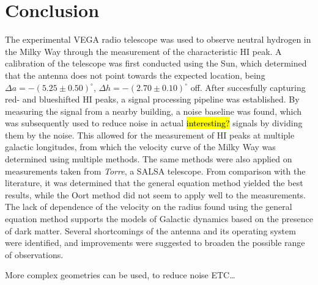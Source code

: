 \section{Conclusion}

The experimental VEGA radio telescope was used to observe neutral hydrogen in the Milky Way through the measurement of the characteristic HI peak. A calibration of the telescope was first conducted using the Sun, which determined that the antenna does not point towards the expected location, being $\Delta a = -(5.25 \pm 0.50)^\circ$, $\Delta h = -(2.70 \pm 0.10)^\circ$ off. After succesfully capturing red- and blueshifted HI peaks, a signal processing pipeline was established. By measuring the signal from a nearby building, a noise baseline was found, which was subsequently used to reduce noise in actual \hl{interesting?} signals by dividing them by the noise. This allowed for the measurement of HI peaks at multiple galactic longitudes, from which the velocity curve of the Milky Way was determined using multiple methods. The same methods were also applied on measurements taken from \emph{Torre}, a SALSA telescope. From comparison with the literature, it was determined that the general equation method yielded the best results, while the Oort method did not seem to apply well to the measurements. The lack of dependence of the velocity on the radius found using the general equation method supports the models of Galactic dynamics based on the presence of dark matter.   
Several shortcomings of the antenna and its operating system were identified, and improvements were suggested to broaden the possible range of observations.

More complex geometries can be used, to reduce noise ETC\ldots \cite{burke_introduction_2013}